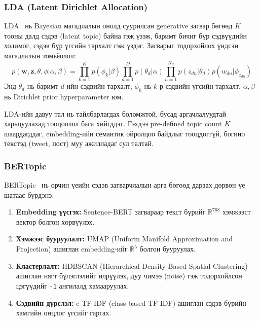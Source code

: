\subsubsection{LDA (Latent Dirichlet Allocation)}

LDA~\cite{blei2003lda} нь Bayesian магадлалын онолд суурилсан generative загвар бөгөөд $K$ тооны далд сэдэв (latent topic) байна гэж үзэж, баримт бичиг бүр сэдвүүдийн холимог, сэдэв бүр үгсийн тархалт гэж үздэг. Загварыг тодорхойлох үндсэн магадлалын томьёолол:
\begin{equation}
    p(\mathbf{w}, \mathbf{z}, \theta, \phi | \alpha, \beta) = \prod_{k=1}^{K} p(\phi_k | \beta) \prod_{d=1}^{D} p(\theta_d | \alpha) \prod_{n=1}^{N_d} p(z_{dn} | \theta_d) p(w_{dn} | \phi_{z_{dn}})
\end{equation}
Энд $\theta_d$ нь баримт $d$-ийн сэдвийн тархалт, $\phi_k$ нь $k$-р сэдвийн үгсийн тархалт, $\alpha, \beta$ нь Dirichlet prior hyperparameter юм.

LDA-ийн давуу тал нь тайлбарлагдах боломжтой, бусад аргачлалуудтай харьцуулахад тооцоолол бага хийгддэг. Гэхдээ pre-defined topic count $K$ шаардагддаг, embedding-ийн семантик ойролцоо байдлыг тооцдоггүй, богино текстэд (tweet, пост) муу ажилладаг сул талтай.

\subsubsection{BERTopic}

BERTopic~\cite{grootendorst2022bertopic} нь орчин үеийн сэдэв загварчлалын арга бөгөөд дараах дөрвөн үе шатаас бүрдэнэ:

\begin{enumerate}
    \item \textbf{Embedding үүсгэх:} Sentence-BERT загвараар текст бүрийг $\mathbb{R}^{768}$ хэмжээст вектор болгон хөрвүүлэх.
    \item \textbf{Хэмжээс бууруулалт:} UMAP (Uniform Manifold Approximation and Projection) ашиглан embedding-ийг $\mathbb{R}^{5}$ болгон бууруулах.
    \item \textbf{Кластерлалт:} HDBSCAN (Hierarchical Density-Based Spatial Clustering) ашиглан нягт бүлэглэлийг илрүүлэх, дуу чимээ (noise) гэж тодорхойлсон цэгүүдийг \texttt{-1} ангилалд хамааруулах.
    \item \textbf{Сэдвийн дүрслэл:} c-TF-IDF (class-based TF-IDF) ашиглан сэдэв бүрийн хамгийн онцлог үгсийг гаргах.
\end{enumerate}

